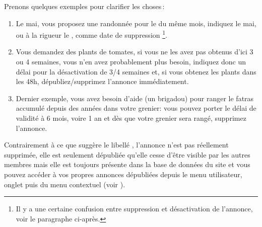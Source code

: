 Prenons quelques exemples pour clarifier les choses\,:
\begin{enumerate}
    \item Le \ier mai, vous proposez une randonnée pour le  du même mois, indiquez le  mai, ou à la rigueur le , comme date de suppression%
    \footnote{Il y a une certaine confusion entre suppression et désactivation de l'annonce, voir le paragraphe ci-après.}.
    \item  Vous demandez des plants de tomates, si vous ne les avez pas obtenus d'ici 3 ou 4 semaines, vous n'en avez probablement plus besoin, indiquez donc un délai pour la désactivation de 3/4 semaines et, si vous obtenez les plants dans les 48h, dépubliez/supprimez l'annonce immédiatement.
    \item Dernier exemple, vous avez besoin d'aide (un brigadou) pour ranger le fatras accumulé depuis des années dans votre grenier: vous pouvez porter le délai de validité à 6 mois, voire 1 an et dès que votre grenier sera rangé, supprimez l'annonce.
\end{enumerate}

Contrairement à ce que suggère le libellé , l'annonce n'est pas réellement supprimée, elle est seulement  dépubliée \cad qu'elle cesse d'être visible par les autres membres mais elle est toujours présente dans la base de données du site et vous pouvez accéder à vos propres annonces  dépubliées depuis le  menu utilisateur, onglet  puis  du menu contextuel  (voir ).

